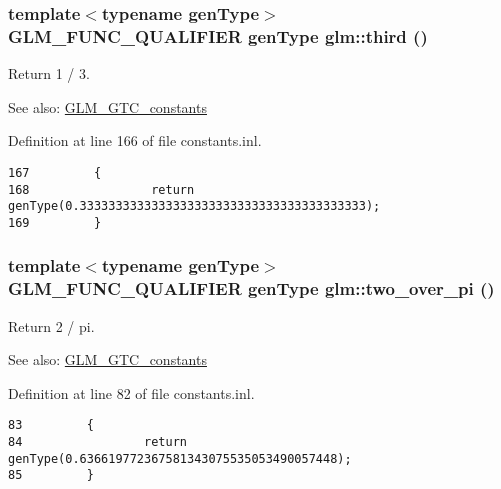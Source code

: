 \hypertarget{group__gtc__constants_ge45f6bc38af321ae365cf702a527c574}{
\subsubsection[third]{\setlength{\rightskip}{0pt plus 5cm}template$<$typename genType$>$ GLM\_\-FUNC\_\-QUALIFIER genType glm::third ()}}
\label{group__gtc__constants_ge45f6bc38af321ae365cf702a527c574}


Return 1 / 3. \begin{Desc}
\item[See also:]\hyperlink{group__gtc__constants}{GLM\_\-GTC\_\-constants} \end{Desc}


Definition at line 166 of file constants.inl.

\begin{Code}\begin{verbatim}167         {
168                 return genType(0.3333333333333333333333333333333333333333);
169         }
\end{verbatim}
\end{Code}


\hypertarget{group__gtc__constants_g3b92bf25d756f2d34a531394146decbf}{
\subsubsection[two\_\-over\_\-pi]{\setlength{\rightskip}{0pt plus 5cm}template$<$typename genType$>$ GLM\_\-FUNC\_\-QUALIFIER genType glm::two\_\-over\_\-pi ()}}
\label{group__gtc__constants_g3b92bf25d756f2d34a531394146decbf}


Return 2 / pi. \begin{Desc}
\item[See also:]\hyperlink{group__gtc__constants}{GLM\_\-GTC\_\-constants} \end{Desc}


Definition at line 82 of file constants.inl.

\begin{Code}\begin{verbatim}83         {
84                 return genType(0.636619772367581343075535053490057448);
85         }
\end{verbatim}
\end{Code}


